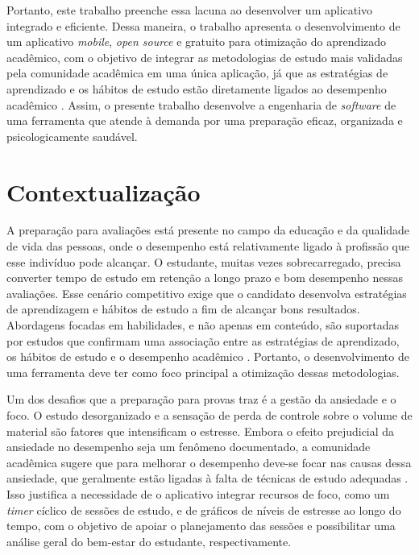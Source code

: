Portanto, este trabalho preenche essa lacuna ao desenvolver um aplicativo integrado e eficiente.
Dessa maneira, o trabalho apresenta o desenvolvimento de um aplicativo \textit{mobile}, \textit{open source} e gratuito para otimização do aprendizado acadêmico, com o objetivo de integrar as metodologias de estudo mais validadas pela comunidade acadêmica em uma única aplicação, já que
as estratégias de aprendizado e os hábitos de estudo estão diretamente ligados ao desempenho acadêmico \cite{bickerdike_2016}.
Assim, o presente trabalho desenvolve a engenharia de \textit{software} de uma ferramenta que atende à demanda por uma preparação eficaz, organizada e psicologicamente saudável.

\section{Contextualização}

A preparação para avaliações está presente no campo da educação e da qualidade de vida das pessoas, onde o desempenho está relativamente ligado à profissão que esse indivíduo pode alcançar.
O estudante, muitas vezes sobrecarregado, precisa converter tempo de estudo em retenção a longo prazo e bom desempenho nessas avaliações.
Esse cenário competitivo exige que o candidato desenvolva estratégias de aprendizagem e hábitos de estudo a fim de alcançar bons resultados.
Abordagens focadas em habilidades, e não apenas em conteúdo, são suportadas por estudos que confirmam uma associação entre as estratégias de aprendizado, os hábitos de estudo e o desempenho acadêmico \cite{bickerdike_2016}.
Portanto, o desenvolvimento de uma ferramenta deve ter como foco principal a otimização dessas metodologias.

Um dos desafios que a preparação para provas traz é a gestão da ansiedade e o foco.
O estudo desorganizado e a sensação de perda de controle sobre o volume de material são fatores que intensificam o estresse.
Embora o efeito prejudicial da ansiedade no desempenho seja um fenômeno documentado, a comunidade acadêmica sugere que para melhorar o desempenho deve-se focar nas causas dessa ansiedade, que geralmente estão ligadas à falta de técnicas de estudo adequadas \cite{kleijn_1994}.
Isso justifica a necessidade de o aplicativo integrar recursos de foco, como um \textit{timer} cíclico de sessões de estudo, e de gráficos de níveis de estresse ao longo do tempo, com o objetivo de apoiar o planejamento das sessões e possibilitar uma análise geral do bem-estar do estudante, respectivamente.

